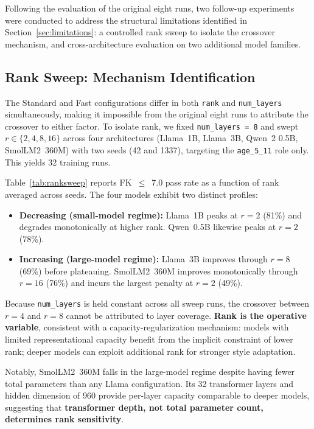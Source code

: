 \documentclass[AMA,Times1COL]{WileyNJDv5} %
\begin{document}
Following the evaluation of the original eight runs, two follow-up experiments were conducted to address the structural limitations identified in Section~\ref{sec:limitations}: a controlled rank sweep to isolate the crossover mechanism, and cross-architecture evaluation on two additional model families.

\subsection{Rank Sweep: Mechanism Identification}\label{sec:ranksweep}

The Standard and Fast configurations differ in both \texttt{rank} and \texttt{num\_layers} simultaneously, making it impossible from the original eight runs to attribute the crossover to either factor. To isolate rank, we fixed \texttt{num\_layers~=~8} and swept $r \in \{2, 4, 8, 16\}$ across four architectures (Llama~1B, Llama~3B, Qwen~2 0.5B, SmolLM2~360M) with two seeds (42 and 1337), targeting the \texttt{age\_5\_11} role only. This yields 32 training runs.

Table~\ref{tab:ranksweep} reports FK~$\leq$~7.0 pass rate as a function of rank averaged across seeds. The four models exhibit two distinct profiles:

\begin{itemize}
    \item \textbf{Decreasing (small-model regime):} Llama~1B peaks at $r=2$ (81\%) and degrades monotonically at higher rank. Qwen~0.5B likewise peaks at $r=2$ (78\%).
    \item \textbf{Increasing (large-model regime):} Llama~3B improves through $r=8$ (69\%) before plateauing. SmolLM2~360M improves monotonically through $r=16$ (76\%) and incurs the largest penalty at $r=2$ (49\%).
\end{itemize}

Because \texttt{num\_layers} is held constant across all sweep runs, the crossover between $r=4$ and $r=8$ cannot be attributed to layer coverage. \textbf{Rank is the operative variable}, consistent with a capacity-regularization mechanism: models with limited representational capacity benefit from the implicit constraint of lower rank; deeper models can exploit additional rank for stronger style adaptation.

Notably, SmolLM2~360M falls in the large-model regime despite having fewer total parameters than any Llama configuration. Its 32 transformer layers and hidden dimension of 960 provide per-layer capacity comparable to deeper models, suggesting that \textbf{transformer depth, not total parameter count, determines rank sensitivity}.
\end{document}
